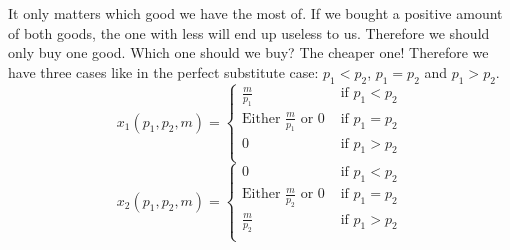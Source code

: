 \documentclass[12pt]{article}
\newcounter{question}[section]
\newenvironment{subquestions}{
  \begin{enumerate}[label=(\roman*)]}{\end{enumerate}}
\begin{document}
\begin{subquestions}
    \textcolor{solution-color}{
      It only matters which good we have the most of. If we bought a positive
      amount of both goods, the one with less will end up useless to us.
      Therefore we should only buy one good. Which one should we buy? The
      cheaper one! Therefore we have three cases like in the perfect
      substitute case: $p_1<p_2$, $p_1=p_2$ and $p_1>p_2$.
      \[
        x_1\left( p_1,p_2,m \right)=
        \begin{cases}
          \frac{m}{p_1} & \text{ if } p_1 < p_2 \\
          \text{Either } \frac{m}{p_1} \text{ or } 0 & \text{ if } p_1 = p_2 \\
          0 & \text{ if } p_1 > p_2 \\
        \end{cases}
      \]
      \[
        x_2\left( p_1,p_2,m \right)=
        \begin{cases}
          0 & \text{ if } p_1 < p_2 \\
          \text{Either } \frac{m}{p_2} \text{ or } 0 & \text{ if } p_1 = p_2 \\
          \frac{m}{p_2} & \text{ if } p_1 > p_2 \\
        \end{cases}
      \]
    }




\end{subquestions}
\end{document}
